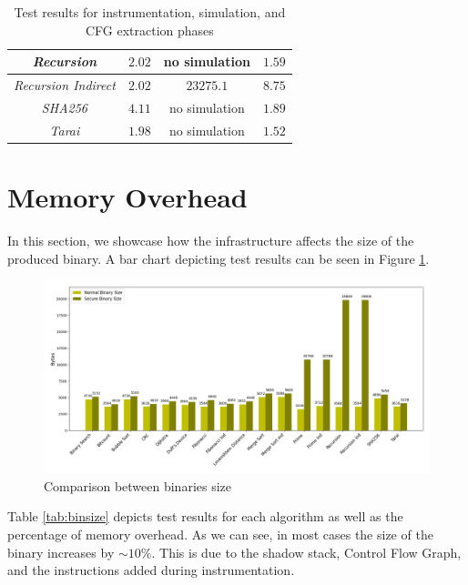 \begin{table}
\begin{tabular}{|c|c|c|c|}
    \hline
    \textit{Recursion}                   & $2.02$                        & no simulation            & $1.59$                       \\
    \hline
    \textit{Recursion Indirect}          & $2.02$                        & $23275.1$                & $8.75$                       \\
    \hline
    \textit{SHA256}                      & $4.11$                        & no simulation            & $1.89$                       \\
    \hline
    \textit{Tarai}                       & $1.98$                        & no simulation            & $1.52$                       \\
    \hline
  \end{tabular}
  \caption{Test results for instrumentation, simulation, and CFG extraction
  phases}
  \label{tab:othertimes}
\end{table}

\section{Memory Overhead}
\label{sec:pa_memory}

In this section, we showcase how the infrastructure affects the size of the produced
binary. A bar chart depicting test results can be seen in Figure
\ref{fig:binsize}.

\begin{figure}[htbp]
  \centering
  \includegraphics[width=\linewidth]{images/size.png}
  \caption{Comparison between binaries size}
  \label{fig:binsize}
\end{figure}

Table \ref{tab:binsize} depicts test results for each algorithm as well as the percentage
of memory overhead. As we can see, in most cases the size of the binary increases
by $\sim 10\%$. This is due to the shadow stack, Control Flow Graph, and the
instructions added during instrumentation.

